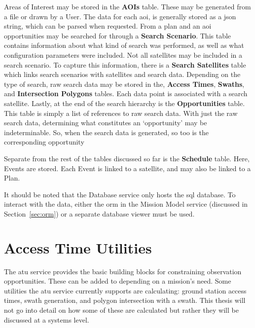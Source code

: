 Areas of Interest may be stored in the \textbf{AOIs} table. These may be
generated from a file or drawn by a User. The data for each \gls{aoi}, is
generally stored as a \gls{json} string, which can be parsed when requested.
From a plan and an \gls{aoi} opportunities may be searched for through a
\textbf{Search Scenario}.  This table contains information about what kind of
search was performed, as well as what configuration parameters were included.
Not all satellites may be included in a search scenario. To capture this
information, there is a \textbf{Search Satellites} table which links search
scenarios with satellites and search data.  Depending on the type of search,
raw search data may be stored in the, \textbf{Access Times}, \textbf{Swaths},
and \textbf{Intersection Polygons} tables. Each data point is associated with a
search satellite.  Lastly, at the end of the search hierarchy is the
\textbf{Opportunities} table.  This table is simply a list of references to raw
search data. With just the raw search data, determining what constitutes an
`opportunity' may be indeterminable.  So, when the search data is generated, so
too is the corresponding opportunity

Separate from the rest of the tables discussed so far is the \textbf{Schedule}
table. Here, Events are stored. Each Event is linked to a satellite, and may
also be linked to a Plan.

It should be noted that the Database service only hosts the \gls{sql} database.
To interact with the data, either the \acrshort{orm} in the Mission Model
service (discussed in Section~\ref{sec:orm}) or a separate database viewer must
be used.




\section{Access Time Utilities}\label{sec:atu}

The \gls{atu} service provides the basic building blocks for constraining
observation opportunities. These can be added to depending on a mission’s need.
Some utilities the \gls{atu} service currently supports are calculating: ground
station access times, swath generation, and polygon intersection with a swath.
This thesis will not go into detail on how some of these are calculated but
rather they will be discussed at a systems level.

